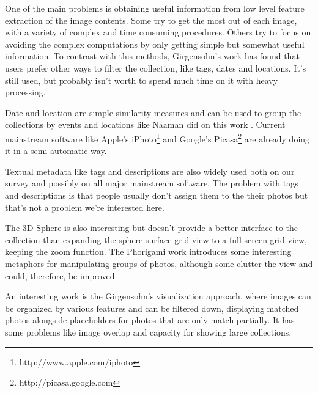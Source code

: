 One of the main problems is obtaining useful information from low level feature extraction of the image contents. Some try to get the most out of each image, with a variety of complex and time consuming procedures. Others try to focus on avoiding the complex computations by only getting simple but somewhat useful information. To contrast with this methods, Girgensohn's work \cite{Girgensohn:2010} has found that users prefer other ways to filter the collection, like tags, dates and locations. It's still used, but probably isn't worth to spend much time on it with heavy processing.

Date and location are simple similarity measures and can be used to group the collections by events and locations like Naaman did on this work  \cite{Naaman:2004p1802}. Current mainstream software like Apple's iPhoto\footnote{http://www.apple.com/iphoto} and Google's Picasa\footnote{http://picasa.google.com} are already doing it in a semi-automatic way.

Textual metadata like tags and descriptions are also widely used both on our survey and possibly on all major mainstream software. The problem with tags and descriptions is that people usually don't assign them to the their photos but that's not a problem we're interested here.

The 3D Sphere \cite{Schaefer:2010p1871} is also interesting but doesn't provide a better interface to the collection than expanding the sphere surface grid view to a full screen grid view, keeping the zoom function. The Phorigami work \cite{Hsu:2009p2696} introduces some interesting metaphors for manipulating groups of photos, although some clutter the view and could, therefore, be improved.

An interesting work is the Girgensohn's \cite{Girgensohn:2010} visualization approach, where images can be organized by various features and can be filtered down, displaying matched photos alongside placeholders for photos that are only match partially. It has some problems like image overlap and capacity for showing large collections.


